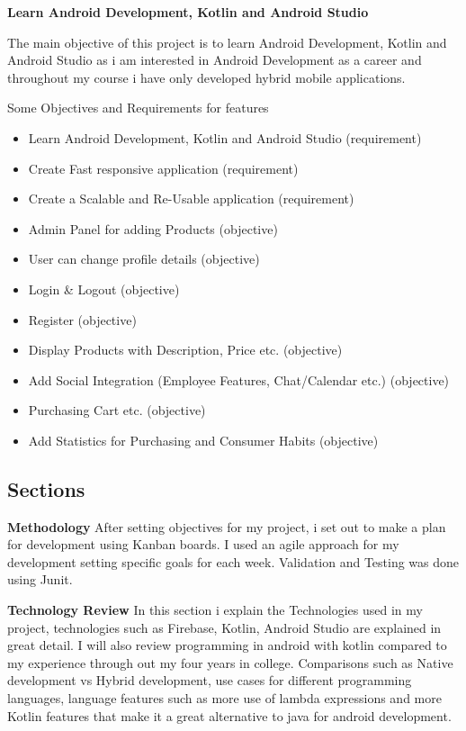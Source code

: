 \textbf {Learn Android Development, Kotlin and Android Studio} \newline

The main objective of this project is to learn Android Development, Kotlin and Android Studio as i am interested in Android Development as a career and throughout my course i have only developed hybrid mobile applications. \newline

Some Objectives and Requirements for features
\begin{itemize}
    \item Learn Android Development, Kotlin and Android Studio (requirement)
    \item Create Fast responsive application (requirement)
    \item Create a Scalable and Re-Usable application (requirement)
    \item Admin Panel for adding Products (objective)
    \item User can change profile details (objective)
    \item Login \& Logout (objective)
    \item Register (objective)
    \item Display Products with Description, Price etc. (objective)
    \item Add Social Integration (Employee Features, Chat/Calendar etc.) (objective)
    \item Purchasing Cart etc. (objective)
    \item Add Statistics for Purchasing and Consumer Habits (objective)
\end{itemize}

\newpage

\subsection{Sections}

\textbf {Methodology}
After setting objectives for my project, i set out to make a plan for development using Kanban boards. I used an agile approach for my development setting specific goals for each week. Validation and Testing was done using Junit.
\newline


\textbf {Technology Review}
In this section i explain the Technologies used in my project, technologies such as Firebase, Kotlin, Android Studio are explained in great detail. I will also review programming in android with kotlin compared to my experience through out my four years in college. Comparisons such as Native development vs Hybrid development, use cases for different programming languages, language features such as more use of lambda expressions and more Kotlin features that make it a great alternative to java for android development.
\newline


